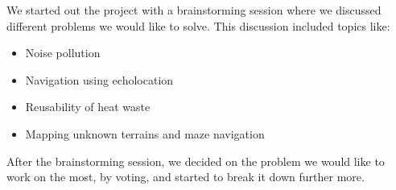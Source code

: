 We started out the project with a brainstorming session where we discussed different problems we would like to solve. This discussion included topics like:
\begin{itemize}
	\item Noise pollution
	\item Navigation using echolocation
	\item Reusability of heat waste
	\item Mapping unknown terrains and maze navigation
\end{itemize}

After the brainstorming session, we decided on the problem we would like to work on the most, by voting, and started to break it down further more.

